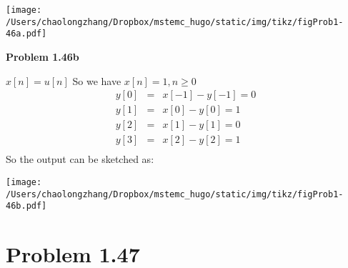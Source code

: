 \documentclass[koma,a4paper,utopia,12pt,listings-color,microtype,paralist,colorlinks,urlcolor=red]{org-article}
\begin{document}
\begin{center}
\texttt{[image: /Users/chaolongzhang/Dropbox/mstemc\_hugo/static/img/tikz/figProb1-46a.pdf]}
\end{center}

\textbf{Problem 1.46b}



\(x[n] = u[n]\) So  we have \(x[n] = 1, n\geq 0\)
\begin{eqnarray*}
y[0]&=& x[-1] - y[-1] = 0 \\
y[1]&=& x[0] - y[0] = 1 \\
y[2]&=& x[1] - y[1] = 0 \\
y[3]&=& x[2] - y[2] = 1 \\
\end{eqnarray*}
So the output can be sketched as:

\begin{center}
\texttt{[image: /Users/chaolongzhang/Dropbox/mstemc\_hugo/static/img/tikz/figProb1-46b.pdf]}
\end{center}
\section{Problem 1.47}
\label{sec:orgc922959}
\end{document}

